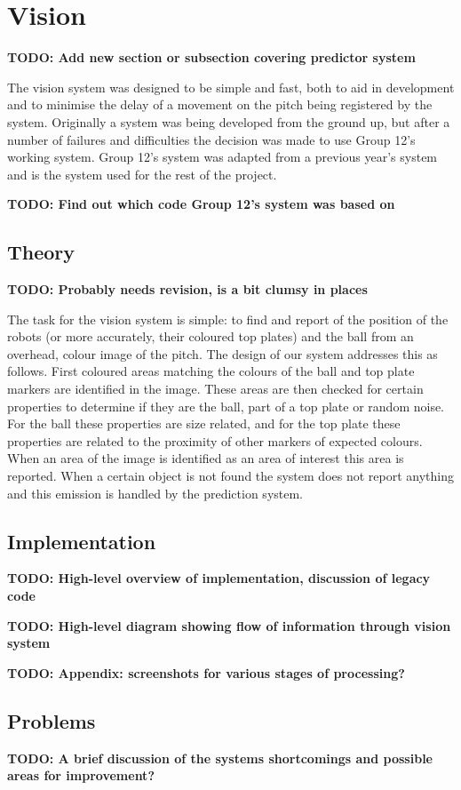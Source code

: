 \newcommand\visiontodo[1]{\textbf{TODO: #1}}

\section{Vision}

\visiontodo{Add new section or subsection covering predictor system}

The vision system was designed to be simple and fast, both to aid in development and to minimise the delay of a movement on the
pitch being registered by the system. Originally a system was being developed from the ground up, but after a number of failures
and difficulties the decision was made to use Group 12's working system. Group 12's system was adapted from a previous year's
system and is the system used for the rest of the project.

\visiontodo{Find out which code Group 12's system was based on}

\subsection{Theory}

\visiontodo{Probably needs revision, is a bit clumsy in places}

The task for the vision system is simple: to find and report of the position of the robots (or more accurately, their coloured
top plates) and the ball from an overhead, colour image of the pitch. The design of our system addresses this as follows. First
coloured areas matching the colours of the ball and top plate markers are identified in the image. These areas are then checked
for certain properties to determine if they are the ball, part of a top plate or random noise. For the ball these properties
are size related, and for the top plate these properties are related to the proximity of other markers of expected colours.
When an area of the image is identified as an area of interest this area is reported. When a certain object is not found the
system does not report anything and this emission is handled by the prediction system.

\subsection{Implementation}

\visiontodo{High-level overview of implementation, discussion of legacy code}

\visiontodo{High-level diagram showing flow of information through vision system}

\visiontodo{Appendix: screenshots for various stages of processing?}

\subsection{Problems}

\visiontodo{A brief discussion of the systems shortcomings and possible areas for improvement?}
